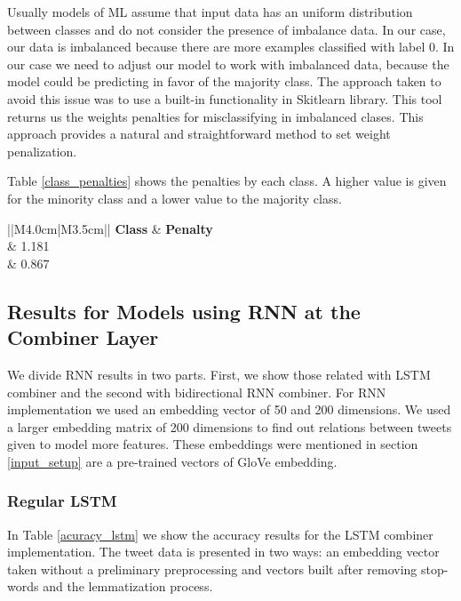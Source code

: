 \documentclass[12pt]{report}
\begin{document}
Usually models of \ac{ML} assume that input data has an uniform distribution between classes and do not consider the presence of imbalance data. In our case, our data is imbalanced because there are more examples classified with label 0. In our case we need to adjust our model to work with imbalanced data, because the model could be predicting in favor of the majority class. The approach taken to avoid this issue was to use a built-in functionality in Skitlearn library. This tool returns us the weights penalties for misclassifying in imbalanced clases. This approach provides a natural and straightforward method to set weight penalization.

Table \ref{class_penalties} shows the penalties by each class. A higher value is given for the minority class and a lower value to the majority class.

\begin{table}[H]
	\centering
	\begin{tabular}{||M{4.0cm}|M{3.5cm}||}
		\hline
		\textbf{Class} 	& \textbf{Penalty}		\\         	& 1.181          		\\  & 0.867     \\ \hline	
	\end{tabular}
	\caption{Triplets Distribution}\label{class_penalties}
\end{table}



\subsection{Results for Models using RNN at the Combiner Layer}
We divide \ac{RNN} results in two parts. First, we show those  related with \ac{LSTM} combiner and the second with bidirectional \ac{RNN} combiner. 
For RNN implementation we used an embedding vector of 50 and 200 dimensions. We used a larger embedding matrix of 200 dimensions to find out relations between tweets given to model more features. These embeddings were mentioned in section \ref{input_setup} are a pre-trained vectors of GloVe embedding.

\subsubsection{Regular LSTM}
In Table \ref{acuracy_lstm} we show the accuracy results for the \ac{LSTM}  combiner implementation. The tweet data is presented in two ways: an embedding vector taken without a preliminary preprocessing and vectors built after removing stop-words and the lemmatization process.
\end{document}
